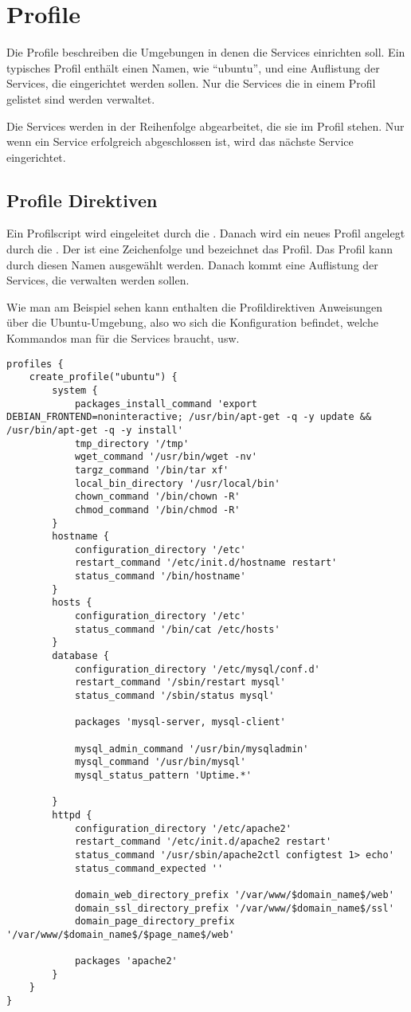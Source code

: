 \section{Profile}

Die Profile beschreiben die Umgebungen in denen die
Services einrichten soll. Ein typisches Profil enthält einen Namen,
wie ``ubuntu'', und eine Auflistung
der Services, die eingerichtet werden sollen. Nur die Services die in einem
Profil gelistet sind werden verwaltet.

Die Services werden in der Reihenfolge abgearbeitet, die sie im Profil stehen.
Nur wenn ein Service erfolgreich abgeschlossen ist, wird das nächste Service eingerichtet.

\subsection{Profile Direktiven}

Ein Profilscript wird eingeleitet durch die .
Danach wird ein neues Profil angelegt durch die
. Der  ist eine Zeichenfolge und
bezeichnet das Profil. Das Profil kann durch diesen Namen ausgewählt werden. 
Danach kommt eine Auflistung der
Services, die verwalten werden sollen.

Wie man am Beispiel sehen kann enthalten die Profildirektiven Anweisungen
über die Ubuntu-Umgebung, also wo sich die Konfiguration befindet, welche
Kommandos man für die Services braucht, usw.

\begin{lstlisting}[style=Java, caption=Beispiel Profil eines Ubuntu Servers]
profiles {
	create_profile("ubuntu") {
		system {
			packages_install_command 'export DEBIAN_FRONTEND=noninteractive; /usr/bin/apt-get -q -y update && /usr/bin/apt-get -q -y install'
			tmp_directory '/tmp'
			wget_command '/usr/bin/wget -nv'
			targz_command '/bin/tar xf'
			local_bin_directory '/usr/local/bin'
			chown_command '/bin/chown -R'
			chmod_command '/bin/chmod -R'
		}
		hostname {
			configuration_directory '/etc'
			restart_command '/etc/init.d/hostname restart'
			status_command '/bin/hostname'
		}
		hosts {
			configuration_directory '/etc'
			status_command '/bin/cat /etc/hosts'
		}
		database {
			configuration_directory '/etc/mysql/conf.d'
			restart_command '/sbin/restart mysql'
			status_command '/sbin/status mysql'
			
			packages 'mysql-server, mysql-client'
			
			mysql_admin_command '/usr/bin/mysqladmin'
			mysql_command '/usr/bin/mysql'
			mysql_status_pattern 'Uptime.*'
			
		}
		httpd {
			configuration_directory '/etc/apache2'
			restart_command '/etc/init.d/apache2 restart'
			status_command '/usr/sbin/apache2ctl configtest 1> echo'
			status_command_expected ''
			
			domain_web_directory_prefix '/var/www/$domain_name$/web'
			domain_ssl_directory_prefix '/var/www/$domain_name$/ssl'
			domain_page_directory_prefix '/var/www/$domain_name$/$page_name$/web'
			
			packages 'apache2'
		}
	}
}
\end{lstlisting}

